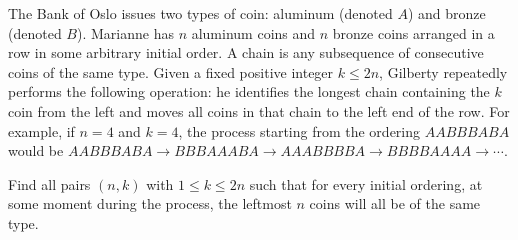 The Bank of Oslo issues two types of coin: aluminum (denoted $A$) and bronze
(denoted $B$). Marianne has $n$ aluminum coins and $n$ bronze coins arranged in a
row in some arbitrary initial order.
A chain is any subsequence of consecutive coins of the same type.
Given a fixed positive integer $k \leq 2n$,
Gilberty repeatedly performs the following operation:
he identifies the longest chain containing the $k$ coin from the left
and moves all coins in that chain to the left end of the row.
For example, if $n=4$ and $k=4$, the process starting
from the ordering $AABBBABA$ would be
$AABBBABA \to BBBAAABA \to AAABBBBA \to BBBBAAAA \to \dotsb$.

Find all pairs $(n,k)$ with $1 \leq k \leq 2n$
such that for every initial ordering,
at some moment during the process,
the leftmost $n$ coins will all be of the same type.